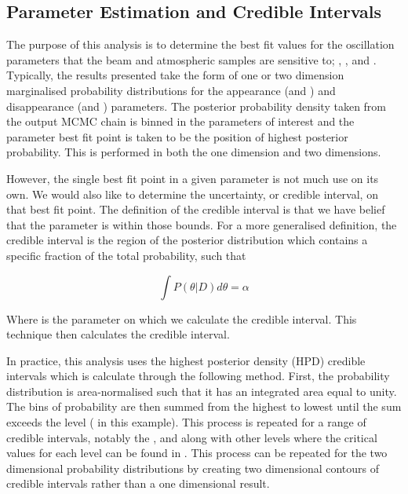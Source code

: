 \subsection{Parameter Estimation and Credible Intervals}
\label{sec:MarkovChainMonteCarlo_ParameterEstimation}

The purpose of this analysis is to determine the best fit values for the oscillation parameters that the beam and atmospheric samples are sensitive to; \sinsqatm, \sinsqreac, \delmsqatm and \dcp. Typically, the results presented take the form of one or two dimension marginalised probability distributions for the appearance (\sinsqreac and \dcp) and disappearance (\sinsqatm and \delmsqatm) parameters. The posterior probability density taken from the output MCMC chain is binned in the parameters of interest and the parameter best fit point is taken to be the position of highest posterior probability. This is performed in both the one dimension and two dimensions.

However, the single best fit point in a given parameter is not much use on its own. We would also like to determine the uncertainty, or credible interval, on that best fit point. The definition of the \quickmath{1\sigma} credible interval is that we have  belief that the parameter is within those bounds. For a more generalised definition, the credible interval is the region of the posterior distribution which contains a specific fraction of the total probability, such that

\begin{equation}
\int P(\theta|D)d\theta = \alpha
\end{equation}

Where \quickmath{\theta} is the parameter on which we calculate the credible interval. This technique then calculates the  credible interval.

In practice, this analysis uses the highest posterior density (HPD) credible intervals which is calculate through the following method. First, the probability distribution is area-normalised such that it has an integrated area equal to unity. The bins of probability are then summed from the highest to lowest until the sum exceeds the \quickmath{1\sigma} level ( in this example). This process is repeated for a range of credible intervals, notably the \quickmath{1\sigma}, \quickmath{2\sigma} and \quickmath{3\sigma} along with other levels where the critical values for each level can be found in \cite{Particle_Data_Group2020-ms}. This process can be repeated for the two dimensional probability distributions by creating two dimensional contours of credible intervals rather than a one dimensional result. 

